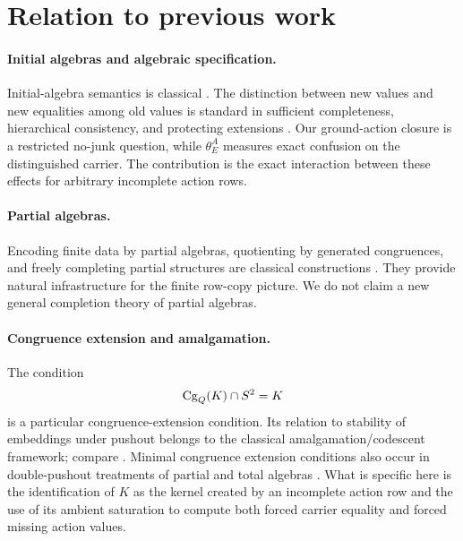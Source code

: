 \section{Relation to previous work}\label{sec:related}

\paragraph{Initial algebras and algebraic specification.}
Initial-algebra semantics is classical \cite{GoguenThatcherWagner1978,Wirsing1990}.  The distinction between new values and new equalities among old values is standard in sufficient completeness, hierarchical consistency, and protecting extensions \cite{KapurNarendranZhang1987,SannellaTarlecki2012,Bernot1989}.  Our ground-action closure is a restricted no-junk question, while $\theta_E^A$ measures exact confusion on the distinguished carrier.  The contribution is the exact interaction between these effects for arbitrary incomplete action rows.

\paragraph{Partial algebras.}
Encoding finite data by partial algebras, quotienting by generated congruences, and freely completing partial structures are classical constructions \cite{BurmeisterSchmidt1967,Burmeister1970,Burmeister1986}.  They provide natural infrastructure for the finite row-copy picture.  We do not claim a new general completion theory of partial algebras.

\paragraph{Congruence extension and amalgamation.}
The condition
\[
\operatorname{Cg}_Q(K)\cap S^2=K
\]
is a particular congruence-extension condition.  Its relation to stability of embeddings under pushout belongs to the classical amalgamation/codescent framework; compare \cite{Zangurashvili2003}.  Minimal congruence extension conditions also occur in double-pushout treatments of partial and total algebras \cite{LlabresRossello2001}.  What is specific here is the identification of $K$ as the kernel created by an incomplete action row and the use of its ambient saturation to compute both forced carrier equality and forced missing action values.

